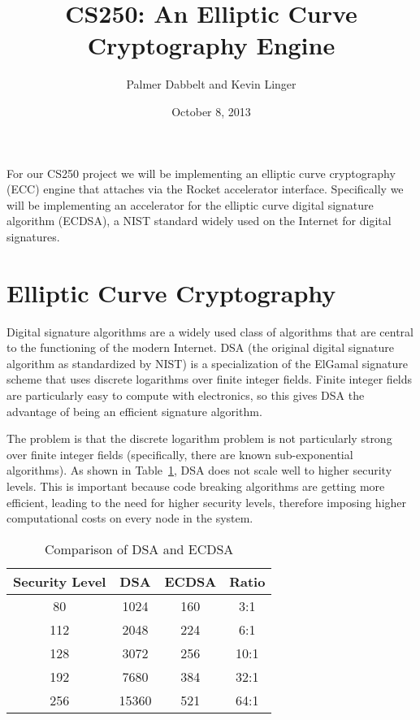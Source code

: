 \documentclass[twocolumn]{article}
\title{CS250: An Elliptic Curve Cryptography Engine}
\author{Palmer Dabbelt and Kevin Linger}
\date{October 8, 2013}
\begin{document}
\maketitle

For our CS250 project we will be implementing an elliptic curve
cryptography (ECC) engine that attaches via the Rocket accelerator
interface.  Specifically we will be implementing an accelerator for
the elliptic curve digital signature algorithm (ECDSA), a NIST
standard widely used on the Internet for digital signatures.

\section{Elliptic Curve Cryptography}

Digital signature algorithms\cite{fips-186-3} are a widely used class
of algorithms that are central to the functioning of the modern
Internet.  DSA\cite{us-dsa} (the original digital signature algorithm
as standardized by NIST) is a specialization of the ElGamal signature
scheme\cite{elgamal-sig} that uses discrete logarithms over finite
integer fields.  Finite integer fields are particularly easy to
compute with electronics, so this gives DSA the advantage of being an
efficient signature algorithm.

The problem is that the discrete logarithm problem is not particularly
strong over finite integer fields (specifically, there are known
sub-exponential algorithms\cite{adleman-subexp}).  As shown in
Table~\ref{key-sizes}, DSA does not scale well to higher security
levels.  This is important because code breaking algorithms are
getting more efficient, leading to the need for higher security
levels, therefore imposing higher computational costs on every node in
the system.

\begin{table}[h]
  \begin{center}
    \begin{tabular}{cccc}
      Security Level & DSA & ECDSA & Ratio \\
      \hline
      80 & 1024 & 160 & 3:1 \\
      112 & 2048 & 224 & 6:1 \\
      128 & 3072 & 256 & 10:1 \\
      192 & 7680 & 384 & 32:1 \\
      256 & 15360 & 521 & 64:1 \\
    \end{tabular}
  \end{center}

  \caption{Comparison of DSA and ECDSA\cite{nsa-case_for_ecc}
    \label{key-sizes}}
\end{table}
\end{document}
